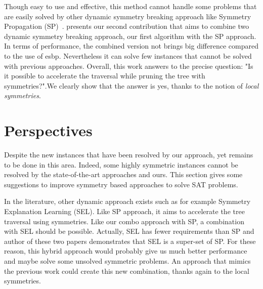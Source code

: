 Though easy to use and effective, this method cannot handle some problems that are easily solved by other
dynamic symmetry breaking approach like Symmetry Propagation (SP)~\cite{Devriendt12}.
 presents our second contribution that aims to combine two dynamic symmetry breaking approach, our first algorithm  with the SP approach. In terms of performance, the combined version not brings big difference
compared to the use of esbp. Nevertheless it can solve few instances that cannot be solved with previous approaches.
Overall,  this  work  answers  to  the  precise  question: "Is it possible to accelerate the traversal while pruning the tree with symmetries?".We clearly show that the answer is yes, thanks to the notion of \textit{local symmetries}.


%
%
%
%
%
%
%
%
%

\section{Perspectives}

Despite the new instances that have been resolved by our approach, yet remains to be done in this area.
Indeed, some highly symmetric instances cannot be resolved by the state-of-the-art approaches and ours.
This section gives some suggestions to improve symmetry based approaches to solve SAT problems.

In the literature, other dynamic approach exists such as for example Symmetry Explanation Learning (SEL)\cite{devriendt2017symmetric}. Like SP approach, it aims to accelerate the tree traversal using symmetries.
Like our combo approach with SP, a combination with SEL should be possible.
Actually, SEL has fewer requirements than SP and author of these two papers demonstrates that
SEL is a super-set of SP. For these reason, this hybrid approach would probably give us much better performance and 
maybe solve some unsolved symmetric problems.
An approach that mimics the previous work could create this new combination, thanks again to the local symmetries.

